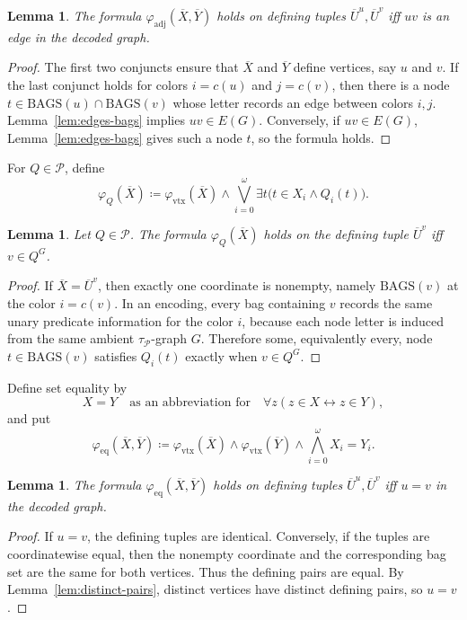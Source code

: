 \documentclass[11pt]{article}
\newtheorem{lemma}[theorem]{Lemma}
\theoremstyle{definition}
\newcommand{\defeq}{\coloneqq}
\newcommand{\Bags}{\mathrm{BAGS}}
\newcommand{\vtx}{\mathrm{vtx}}
\newcommand{\adj}{\mathrm{adj}}
\newcommand{\Pred}{\mathcal P}
\newcommand{\eq}{\mathrm{eq}}
\newcommand{\tuple}[1]{\overline{#1}}
\begin{document}
\begin{lemma}\label{lem:adj}
The formula \(\varphi_{\adj}(\tuple X,\tuple Y)\) holds on defining tuples
\(\tuple U^u,\tuple U^v\) iff \(uv\) is an edge in the decoded graph.
\end{lemma}

\begin{proof}
The first two conjuncts ensure that \(\tuple X\) and \(\tuple Y\) define vertices,
say \(u\) and \(v\).  If the last conjunct holds for colors \(i=c(u)\) and
\(j=c(v)\), then there is a node \(t\in\Bags(u)\cap\Bags(v)\) whose letter records
an edge between colors \(i,j\).  Lemma~\ref{lem:edges-bags} implies \(uv\in E(G)\).  Conversely, if
\(uv\in E(G)\), Lemma~\ref{lem:edges-bags} gives such a node \(t\), so the formula holds.
\end{proof}

For \(Q\in\Pred\), define
\[
  \varphi_Q(\tuple X)\defeq
  \varphi_{\vtx}(\tuple X)\wedge
  \bigvee_{i=0}^{\omega}\exists t\bigl(t\in X_i\wedge Q_i(t)\bigr).
\]

\begin{lemma}\label{lem:pred}
Let \(Q\in\Pred\).  The formula \(\varphi_Q(\tuple X)\) holds on the defining
tuple \(\tuple U^v\) iff \(v\in Q^G\).
\end{lemma}

\begin{proof}
If \(\tuple X=\tuple U^v\), then exactly one coordinate is nonempty, namely
\(\Bags(v)\) at the color \(i=c(v)\).  In an encoding, every bag containing \(v\)
records the same unary predicate information for the color \(i\), because each
node letter is induced from the same ambient \(\tau_{\Pred}\)-graph \(G\).
Therefore some, equivalently every, node \(t\in\Bags(v)\) satisfies \(Q_i(t)\)
exactly when \(v\in Q^G\).
\end{proof}

Define set equality by
\[
  X=Y \quad\text{as an abbreviation for}\quad
  \forall z(z\in X\leftrightarrow z\in Y),
\]
and put
\[
  \varphi_{\eq}(\tuple X,\tuple Y)
  \defeq
  \varphi_{\vtx}(\tuple X)\wedge\varphi_{\vtx}(\tuple Y)
  \wedge\bigwedge_{i=0}^{\omega} X_i=Y_i.
\]

\begin{lemma}\label{lem:eq}
The formula \(\varphi_{\eq}(\tuple X,\tuple Y)\) holds on defining tuples
\(\tuple U^u,\tuple U^v\) iff \(u=v\) in the decoded graph.
\end{lemma}

\begin{proof}
If \(u=v\), the defining tuples are identical.  Conversely, if the tuples are
coordinatewise equal, then the nonempty coordinate and the corresponding bag set
are the same for both vertices.  Thus the defining pairs are equal.  By
Lemma~\ref{lem:distinct-pairs}, distinct vertices have distinct defining pairs, so \(u=v\).
\end{proof}
\end{document}
